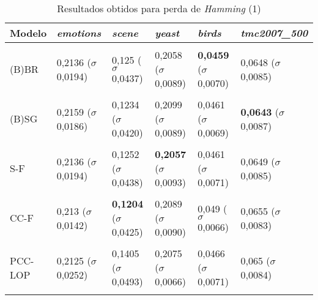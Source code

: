 
\begin{table}[htbp]
	\centering
	\caption{Resultados obtidos para perda de \textit{{Hamming}} (1)}
		\begin{tabular}
        { p{0.88in} p{0.88in} p{0.88in} p{0.88in} p{0.88in} p{0.88in} }
        
        \hline
Modelo & \textit{emotions} & \textit{scene} & \textit{yeast} & \textit{birds} & \textit{tmc2007\_500} \\ 
\hline \\

(B)BR & 0,2136 \newline ($\sigma$ 0,0194) & 0,125 \newline ($\sigma$ 0,0437) & 0,2058 \newline ($\sigma$ 0,0089) & \textbf{0,0459} \newline ($\sigma$ 0,0070) & 0,0648 \newline ($\sigma$ 0,0085) \\ \\
(B)SG & 0,2159 \newline ($\sigma$ 0,0186) & 0,1234 \newline ($\sigma$ 0,0420) & 0,2099 \newline ($\sigma$ 0,0089) & 0,0461 \newline ($\sigma$ 0,0069) & \textbf{0,0643} \newline ($\sigma$ 0,0087) \\ \\
S-F & 0,2136 \newline ($\sigma$ 0,0194) & 0,1252 \newline ($\sigma$ 0,0438) & \textbf{0,2057} \newline ($\sigma$ 0,0093) & 0,0461 \newline ($\sigma$ 0,0071) & 0,0649 \newline ($\sigma$ 0,0085) \\ \\
CC-F & 0,213 \newline ($\sigma$ 0,0142) & \textbf{0,1204} \newline ($\sigma$ 0,0425) & 0,2089 \newline ($\sigma$ 0,0090) & 0,049 \newline ($\sigma$ 0,0066) & 0,0655 \newline ($\sigma$ 0,0083) \\ \\
PCC-LOP & 0,2125 \newline ($\sigma$ 0,0252) & 0,1405 \newline ($\sigma$ 0,0493) & 0,2075 \newline ($\sigma$ 0,0066) & 0,0466 \newline ($\sigma$ 0,0071) & 0,065 \newline ($\sigma$ 0,0084) \\ \\

\end{tabular}
\end{table}
